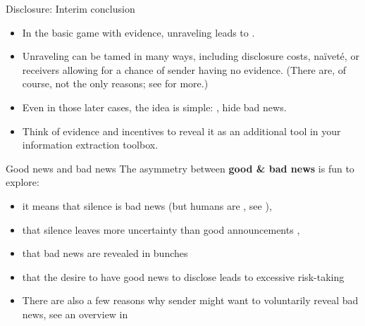 \documentclass[english,10pt
,aspectratio=169
]{beamer}
\begin{document}
\begin{frame}{Disclosure: Interim conclusion}
\begin{itemize}
	\item In the basic game with evidence, unraveling leads to .
	\item Unraveling can be tamed in many ways, including disclosure costs, na{\"i}vet{\'e}, or receivers allowing for a chance of sender having no evidence. (There are, of course, not the only reasons; see \cite{dranove_quality_2010} for more.)
	\item Even in those later cases, the idea is simple: , \alert{hide bad news}.
	\item Think of evidence and incentives to reveal it as an additional tool in your information extraction toolbox.
\end{itemize}
\end{frame}


\begin{frame}{Good news and bad news}
	The asymmetry between \textbf{good \& bad news} is fun to explore:
	\begin{itemize}[<+->]
		\item it means that \alert{silence is bad news} (but humans are , see \cite*{jin_is_2021}), 
		\item that \alert{silence leaves more uncertainty} than good announcements \citep{shin_disclosures_2003}, 
		\item that bad news are revealed in \alert{bunches} \citep*{acharya_endogenous_2011}
		\item that the desire to have good news to disclose leads to \alert{excessive risk-taking} \citep*{ben-porath_disclosure_2018} %
		
		\bigskip 
		\item There are also a few reasons why sender might want to voluntarily reveal bad news, see an overview in \cite{smirnov_bad_2022}
	\end{itemize}
\end{frame}
\end{document}
